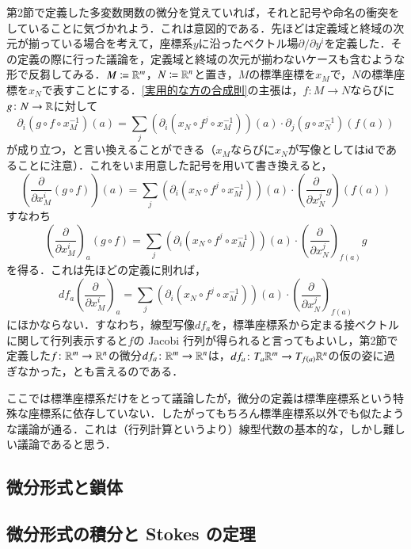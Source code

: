 第2節で定義した多変数関数の微分を覚えていれば，それと記号や命名の衝突をしていることに気づかれよう．これは意図的である．先ほどは定義域と終域の次元が揃っている場合を考えて，座標系$y$に沿ったベクトル場$\partial / \partial y^i$を定義した．その定義の際に行った議論を，定義域と終域の次元が揃わないケースも含むような形で反芻してみる．$M \coloneqq \mathbb{R}^m$，$N \coloneqq \mathbb{R}^n$と置き，$M$の標準座標を$x_M$で，$N$の標準座標を$x_N$で表すことにする．\cref{実用的な方の合成則}の主張は，$f \colon M \to N$ならびに$g \colon N \to \mathbb{R}$に対して
\begin{equation}
\partial_i (g \circ f \circ x_M^{-1}) (a) = \sum_{j} \left( \partial_i (x_N \circ f^j \circ x_M^{-1}) \right) (a) \cdot \partial_j (g \circ x_N^{-1}) (f(a))
\end{equation}が成り立つ，と言い換えることができる（$x_M$ならびに$x_N$が写像としては$\operatorname{id}$であることに注意）．これをいま用意した記号を用いて書き換えると，
\begin{equation}
\left( \frac{\partial}{\partial x^i_M} (g \circ f) \right) (a) = \sum_{j} \left( \partial_i (x_N \circ f^j \circ x_M^{-1}) \right) (a) \cdot \left(\frac{\partial}{\partial x_N^j} g\right) (f(a))
\end{equation}
すなわち
\begin{equation}
\left( \frac{\partial}{\partial x^i_M} \right)_a (g \circ f) = \sum_{j} \left( \partial_i (x_N \circ f^j \circ x_M^{-1}) \right) (a) \cdot \left(\frac{\partial}{\partial x_N^j}\right)_{f(a)} g
\end{equation}
を得る．これは先ほどの定義に則れば，
\begin{equation}
df_a \left( \frac{\partial}{\partial x^i_M} \right)_a = \sum_{j} \left( \partial_i (x_N \circ f^j \circ x_M^{-1}) \right) (a) \cdot \left(\frac{\partial}{\partial x_N^j}\right)_{f(a)}
\end{equation}にほかならない．すなわち，線型写像$df_a$を，標準座標系から定まる接ベクトルに関して行列表示すると$f$の Jacobi 行列が得られると言ってもよいし，第2節で定義した$f \colon \mathbb{R}^m \to \mathbb{R}^n$の微分$df_a \colon \mathbb{R}^m \to \mathbb{R}^n$は，$df_a \colon T_a\mathbb{R}^m \to T_{f(a)}\mathbb{R}^n$の仮の姿に過ぎなかった，とも言えるのである．

\begin{que}
ここでは標準座標系だけをとって議論したが，微分の定義は標準座標系という特殊な座標系に依存していない．したがってもちろん標準座標系以外でも似たような議論が通る．これは（行列計算というより）線型代数の基本的な，しかし難しい議論であると思う．
\end{que}

\subsection{微分形式と鎖体}

\subsection{微分形式の積分と Stokes の定理}